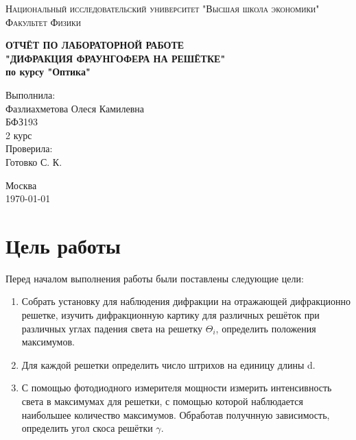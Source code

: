 \documentclass[a4paper, 12pt]{article}
\begin{document}
\begin{titlepage}
\begin{center}
\textsc{Национальный исследовательский университет "Высшая школа экономики"\\[5mm]
Факультет Физики}

\vfill

\textbf{ОТЧЁТ ПО ЛАБОРАТОРНОЙ РАБОТЕ \\[3mm]
"ДИФРАКЦИЯ ФРАУНГОФЕРА НА РЕШЁТКЕ"\\[3mm]
по курсу "Оптика"
\\[20mm]
}
\end{center}

\hfill
\begin{minipage}{.5\textwidth}
Выполнила:\\[2mm] 
Фазлиахметова Олеся Камилевна\\
БФЗ193\\
2 курс\\[5mm]

Проверила:\\[2mm] 
Готовко С. К. 
\end{minipage}%
\vfill
\begin{center}
 Москва\\
 \today
\end{center}
\end{titlepage}



\tableofcontents

\newpage

	\section{Цель работы}

Перед началом выполнения работы были поставлены следующие цели:

\begin{enumerate}

	\item Собрать установку для наблюдения дифракции на отражающей дифракционно решетке, изучить дифракционную картику для различных решёток при различных углах падения света на решетку $\Theta_i$, определить положения максимумов.

	\item Для каждой решетки определить число штрихов на единицу длины d.

	\item С помощью фотодиодного измерителя мощности измерить интенсивность света в максимумах для решетки, с помощью которой наблюдается наибольшее количество максимумов. Обработав получнную зависимость, определить угол скоса решётки $\gamma$.

\end{enumerate}
\end{document}
